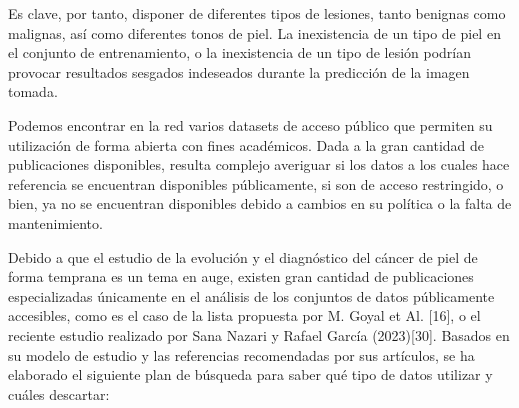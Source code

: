 Es clave, por tanto, disponer de diferentes tipos de lesiones, tanto benignas como malignas, así como diferentes tonos de piel. La inexistencia de un tipo de piel en el conjunto de entrenamiento, o la inexistencia de un tipo de lesión podrían provocar resultados sesgados indeseados durante la predicción de la imagen tomada.

Podemos encontrar en la red varios datasets de acceso público que permiten su utilización de forma abierta con fines académicos. Dada a la gran cantidad de publicaciones disponibles, resulta complejo averiguar si los datos a los cuales hace referencia se encuentran disponibles públicamente, si son de acceso restringido, o bien, ya no se encuentran disponibles debido a cambios en su política o la falta de mantenimiento.

Debido a que el estudio de la evolución y el diagnóstico del cáncer de piel de forma temprana es un tema en auge, existen gran cantidad de publicaciones especializadas únicamente en el análisis de los conjuntos de datos públicamente accesibles, como es el caso de la lista propuesta por M. Goyal et Al. [16], o el reciente estudio realizado por Sana Nazari y Rafael García (2023)[30].
Basados en su modelo de estudio y las referencias recomendadas por sus artículos, se ha elaborado el siguiente plan de búsqueda para saber qué tipo de datos utilizar y cuáles descartar:

